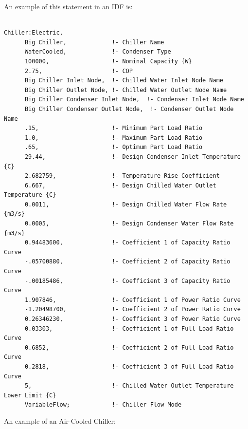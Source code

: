 An example of this statement in an IDF is:

\begin{lstlisting}

Chiller:Electric,
      Big Chiller,             !- Chiller Name
      WaterCooled,             !- Condenser Type
      100000,                  !- Nominal Capacity {W}
      2.75,                    !- COP
      Big Chiller Inlet Node,  !- Chilled Water Inlet Node Name
      Big Chiller Outlet Node, !- Chilled Water Outlet Node Name
      Big Chiller Condenser Inlet Node,  !- Condenser Inlet Node Name
      Big Chiller Condenser Outlet Node,  !- Condenser Outlet Node Name
      .15,                     !- Minimum Part Load Ratio
      1.0,                     !- Maximum Part Load Ratio
      .65,                     !- Optimum Part Load Ratio
      29.44,                   !- Design Condenser Inlet Temperature {C}
      2.682759,                !- Temperature Rise Coefficient
      6.667,                   !- Design Chilled Water Outlet Temperature {C}
      0.0011,                  !- Design Chilled Water Flow Rate {m3/s}
      0.0005,                  !- Design Condenser Water Flow Rate {m3/s}
      0.94483600,              !- Coefficient 1 of Capacity Ratio Curve
      -.05700880,              !- Coefficient 2 of Capacity Ratio Curve
      -.00185486,              !- Coefficient 3 of Capacity Ratio Curve
      1.907846,                !- Coefficient 1 of Power Ratio Curve
      -1.20498700,             !- Coefficient 2 of Power Ratio Curve
      0.26346230,              !- Coefficient 3 of Power Ratio Curve
      0.03303,                 !- Coefficient 1 of Full Load Ratio Curve
      0.6852,                  !- Coefficient 2 of Full Load Ratio Curve
      0.2818,                  !- Coefficient 3 of Full Load Ratio Curve
      5,                       !- Chilled Water Outlet Temperature Lower Limit {C}
      VariableFlow;            !- Chiller Flow Mode
\end{lstlisting}

An example of an Air-Cooled Chiller:

